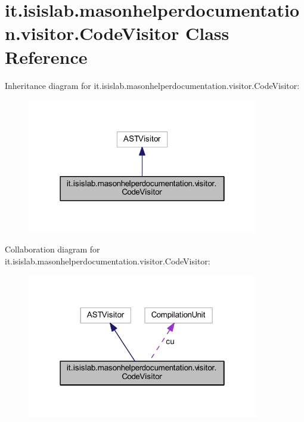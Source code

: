 \hypertarget{classit_1_1isislab_1_1masonhelperdocumentation_1_1visitor_1_1_code_visitor}{\section{it.\-isislab.\-masonhelperdocumentation.\-visitor.\-Code\-Visitor Class Reference}
\label{classit_1_1isislab_1_1masonhelperdocumentation_1_1visitor_1_1_code_visitor}
}


Inheritance diagram for it.\-isislab.\-masonhelperdocumentation.\-visitor.\-Code\-Visitor\-:
\nopagebreak
\begin{figure}[H]
\begin{center}
\leavevmode
\includegraphics[width=286pt]{classit_1_1isislab_1_1masonhelperdocumentation_1_1visitor_1_1_code_visitor__inherit__graph}
\end{center}
\end{figure}


Collaboration diagram for it.\-isislab.\-masonhelperdocumentation.\-visitor.\-Code\-Visitor\-:
\nopagebreak
\begin{figure}[H]
\begin{center}
\leavevmode
\includegraphics[width=286pt]{classit_1_1isislab_1_1masonhelperdocumentation_1_1visitor_1_1_code_visitor__coll__graph}
\end{center}
\end{figure}
